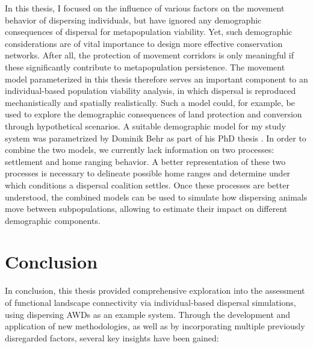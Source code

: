 \documentclass[../FinalThesis.tex]{subfiles}
\begin{document}
In this thesis, I focused on the influence of various factors on the movement
behavior of dispersing individuals, but have ignored any demographic
consequences of dispersal for metapopulation viability. Yet, such demographic
considerations are of vital importance to design more effective conservation
networks. After all, the protection of movement corridors is only meaningful if
these significantly contribute to metapopulation persistence. The movement model
parameterized in this thesis therefore serves an important component to an
individual-based population viability analysis, in which dispersal is reproduced
mechanistically and spatially realistically. Such a model could, for example, be
used to explore the demographic consequences of land protection and conversion
through hypothetical scenarios. A suitable demographic model for my study system
was parametrized by Dominik Behr as part of his PhD thesis \citep{Behr.2021}. In
order to combine the two models, we currently lack information on two processes:
settlement and home ranging behavior. A better representation of these two
processes is necessary to delineate possible home ranges and determine under
which conditions a dispersal coalition settles. Once these processes are better
understood, the combined models can be used to simulate how dispersing animals
move between subpopulations, allowing to estimate their impact on different
demographic components.

\section{Conclusion}

In conclusion, this thesis provided comprehensive exploration into the
assessment of functional landscape connectivity via individual-based dispersal
simulations, using dispersing AWDs as an example system. Through the development
and application of new methodologies, as well as by incorporating multiple
previously disregarded factors, several key insights have been gained:
\end{document}
